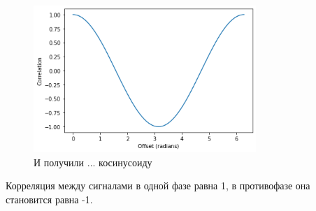 \documentclass[a4paper, 12pt]{report}
\begin{document}
	\begin{figure}[H]
		\centering
		\includegraphics[width=0.75\textwidth]{sin2.png}
		\caption{И получили ... косинусоиду}
		\label{fig:sin2}
	\end{figure}
	Корреляция между сигналами в одной фазе равна 1, в противофазе она становится равна -1.
\end{document}
